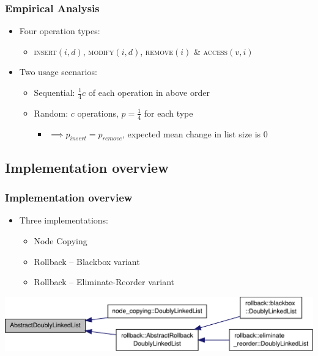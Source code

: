 \documentclass[compress]{beamer}
\begin{document}
\begin{frame}
\frametitle{Empirical Analysis}
\begin{itemize}
  \item Four operation types:
  \begin{itemize}

    \item \textsc{insert}$(i, d)$, \textsc{modify}$(i, d)$, \textsc{remove}$(i)$
    \& \textsc{access}$(v, i)$

  \end{itemize}
  \item Two usage scenarios:
  \begin{itemize}

    \item Sequential: $\frac{1}{4}c$ of each operation in above order

    \item Random: $c$ operations, $p=\frac{1}{4}$ for each type
    \begin{itemize}
      \item ${}\implies p_{insert}=p_{remove}$, expected mean change in list size is 0
    \end{itemize}
  \end{itemize}

\end{itemize}
\end{frame}

\subsection{Implementation overview}

\begin{frame}
\frametitle{Implementation overview}
\begin{itemize}
  \item Three implementations:

  \begin{itemize}
    \item Node Copying
    \item Rollback -- Blackbox variant
    \item Rollback -- Eliminate-Reorder variant
  \end{itemize}
\end{itemize}
\includegraphics[width=\textwidth]{figures/classAbstractDoublyLinkedList__inherit__graph.pdf}
\end{frame}
\end{document}
